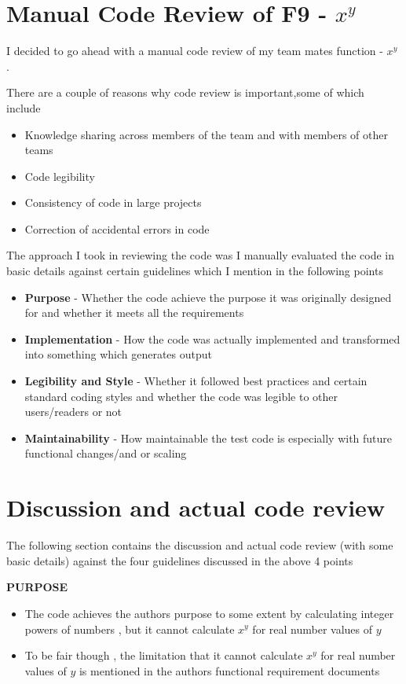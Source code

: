 \documentclass[12pt,letterpaper]{article}
\begin{document}
\section*{Manual Code Review of F9 - $x^y$ }

I decided to go ahead with a manual code review of my team mates function -   $x^y$ . 


There are a couple of reasons why code review is important,some of which include
\begin{itemize}
\item{Knowledge sharing across members of the team and with members of other teams}
\item{Code legibility}
\item{Consistency of code in large projects}
\item{Correction of accidental errors in code}
\end{itemize}


The approach I took in reviewing the code was I manually evaluated the code in basic details against certain guidelines which I mention in the following points 

\begin{itemize}
\item{\textbf{Purpose} - Whether the code achieve the purpose it was originally designed for and whether it meets all the requirements}
\item{\textbf{Implementation} - How the code was actually implemented and transformed into something which generates output}
\item{\textbf{Legibility and Style} - Whether it followed best practices and certain standard coding styles and whether the code was legible to other users/readers or not }
\item{\textbf{Maintainability} - How maintainable the test code is especially with future functional changes/and or scaling}
\end{itemize}


\section*{Discussion and actual code review}
The following section contains the discussion and actual code review (with some basic details) against the four guidelines discussed in the above 4 points \newline

\textbf{PURPOSE}

\begin{itemize}
\item{The code achieves the authors purpose to some extent by calculating integer powers of numbers , but it cannot calculate $x^y$ for real number values of $y$}
\item{To be fair though , the limitation that it cannot calculate $x^y$ for real number values of $y$ is mentioned in the authors functional requirement documents}
\end{itemize}
\end{document}
